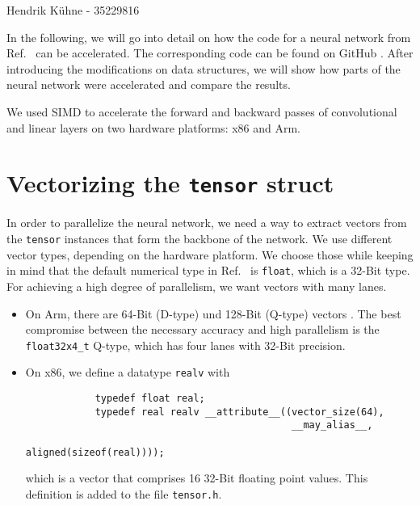 \documentclass{article}
\numberwithin{equation}{section}
\numberwithin{figure}{section}
\numberwithin{table}{section}
\begin{document}
    \begin{center}
        Hendrik Kühne - 35229816
    \end{center}

    \tableofcontents
    \vspace{\baselineskip}
    \vspace{\baselineskip}

    In the following, we will go into detail on how the code for a neural network from Ref.~\cite{Taura:parallel-distributed}
    can be accelerated. The corresponding code can be found on GitHub \cite{Kühne:parallel-distributed}. After introducing
    the modifications on data structures, we will show how parts of the neural network were accelerated and compare the
    results.

    We used SIMD to accelerate the forward and backward passes of convolutional and linear layers on two
    hardware platforms: x86 and Arm.

    \section{Vectorizing the \texorpdfstring{\texttt{tensor}}{tensor} struct}
    \label{sec:tensor}

    In order to parallelize the neural network, we need a way to extract vectors from the \texttt{tensor} instances
    that form the backbone of the network. We use different vector types, depending on the hardware platform. We choose
    those while keeping in mind that the default numerical type in Ref.~\cite{Taura:parallel-distributed} is
    \texttt{float}, which is a 32-Bit type. For achieving a high degree of parallelism, we want vectors with many
    lanes.

    \begin{itemize}
        \item On Arm, there are 64-Bit (D-type) und 128-Bit (Q-type) vectors \cite{NEON:VectorDataTypes}. The best compromise
        between the necessary accuracy and high parallelism is the \texttt{float32x4_t} Q-type, which has four lanes
        with 32-Bit precision.
        \item On x86, we define a datatype \texttt{realv} with
        
        \begin{verbatim}
            typedef float real;
            typedef real realv __attribute__((vector_size(64),
                                              __may_alias__,
                                              aligned(sizeof(real))));
        \end{verbatim}

        which is a vector that comprises 16 32-Bit floating point values. This definition is added to the file
        \texttt{tensor.h}.
    \end{itemize}
\end{document}
